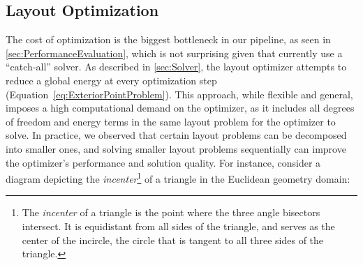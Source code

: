 
\subsection{Layout Optimization}

The cost of optimization is the biggest bottleneck in our pipeline, as seen in \cref{sec:PerformanceEvaluation}, which is not surprising given that \Penrose{} currently use a ``catch-all'' solver. As described in \cref{sec:Solver}, the layout optimizer attempts to reduce a global energy at every optimization step (Equation~\ref{eq:ExteriorPointProblem}). This approach, while flexible and general, imposes a high computational demand on the optimizer, as it includes all degrees of freedom and energy terms in the same layout problem for the optimizer to solve. In practice, we observed that certain layout problems can be decomposed into smaller ones, and solving smaller layout problems sequentially can improve the optimizer's performance and solution quality. For instance, consider a diagram depicting the \emph{incenter}\footnote{The \textit{incenter} of a triangle is the point where the three angle bisectors intersect. It is equidistant from all sides of the triangle, and serves as the center of the incircle, the circle that is tangent to all three sides of the triangle.} of a triangle in the Euclidean geometry domain:

